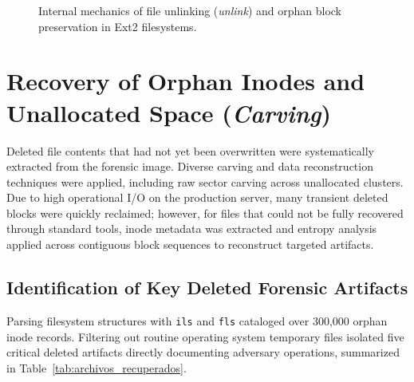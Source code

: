 \begin{figure}[htbp]
\caption{Internal mechanics of file unlinking (\textit{unlink}) and orphan block preservation in Ext2 filesystems.}
\label{fig:ext2_deletion_carving}
\end{figure}

\section{Recovery of Orphan Inodes and Unallocated Space (\textit{Carving})}

Deleted file contents that had not yet been overwritten were systematically extracted from the forensic image. Diverse carving and data reconstruction techniques were applied, including raw sector carving across unallocated clusters. Due to high operational I/O on the production server, many transient deleted blocks were quickly reclaimed; however, for files that could not be fully recovered through standard tools, inode metadata was extracted and entropy analysis applied across contiguous block sequences to reconstruct targeted artifacts.

\subsection{Identification of Key Deleted Forensic Artifacts}

Parsing filesystem structures with \texttt{ils} and \texttt{fls} cataloged over 300,000 orphan inode records. Filtering out routine operating system temporary files isolated five critical deleted artifacts directly documenting adversary operations, summarized in Table~\ref{tab:archivos_recuperados}.


